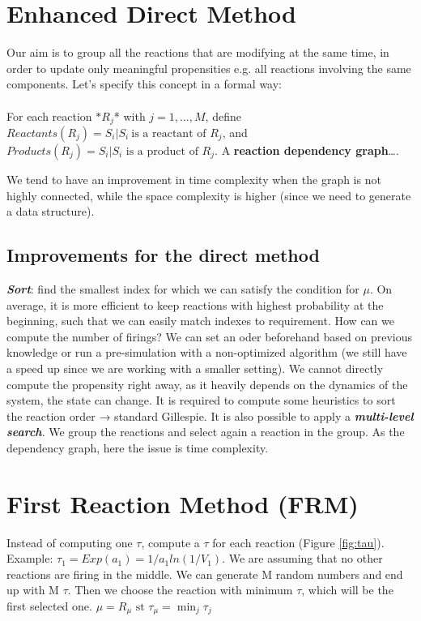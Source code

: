   \section{Enhanced Direct Method}
  Our aim is to group all the reactions that are modifying at the same time, in order to update only meaningful propensities e.g. all reactions involving the same components.
  Let's specify this concept in a formal way: 
  \\
  \\
  \noindent
  For each reaction $*R_j$* with $j = 1,...,M$, define $Reactants(R_j)={S_i|S_i \ \text{is a reactant of }R_j}$, and $Products(R_j) = {S_i|S_i \text{ is a product of }R_j}$.
  A \textbf{reaction dependency graph}\ldots{}.
  
  We tend to have an improvement in time complexity when the graph is not highly connected, while the space complexity is higher (since we need to generate a data structure).
  \subsection{Improvements for the direct method} 
  \textbf{\emph{Sort}}: find the smallest index for which we can satisfy the condition for $\mu$.
  On average, it is more efficient to keep reactions with highest probability at the beginning, such that we can easily match indexes to requirement.
  How can we compute the number of firings? We can set an oder beforehand based on previous knowledge or run a pre-simulation with a non-optimized algorithm (we still have a speed up since we are working with a smaller setting).
  We cannot directly compute the propensity right away, as it heavily depends on the dynamics of the system, the state can change.
  It is required to compute some heuristics to sort the reaction order → standard Gillespie.
  It is also possible to apply a \textbf{\emph{multi-level search}}.
  We group the reactions and select again a reaction in the group.
  As the dependency graph, here the issue is time complexity.

\section{First Reaction Method (FRM)}
Instead of computing one $\tau$, compute a $\tau$ for each reaction (Figure \ref{fig:tau}).
Example: $\tau_1 = Exp(a_1)=1/a_1ln(1/V_1)$.
We are assuming that no other reactions are firing in the middle.
We can generate M random numbers and end up with M $\tau$.
Then we choose the reaction with minimum $\tau$, which will be the first selected one.
$\mu= R_{\mu}\text{ st }\tau_{\mu}= \min_{j}\tau_j$

